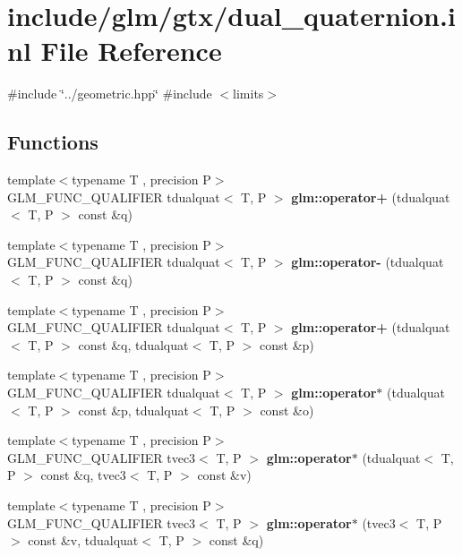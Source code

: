 \hypertarget{dual__quaternion_8inl}{}\section{include/glm/gtx/dual\+\_\+quaternion.inl File Reference}
\label{dual__quaternion_8inl}
{\ttfamily \#include \char`\"{}../geometric.\+hpp\char`\"{}}\newline
{\ttfamily \#include $<$limits$>$}\newline
\subsection*{Functions}
\begin{DoxyCompactItemize}
\item 
{\footnotesize template$<$typename T , precision P$>$ }\\G\+L\+M\+\_\+\+F\+U\+N\+C\+\_\+\+Q\+U\+A\+L\+I\+F\+I\+ER tdualquat$<$ T, P $>$ {\bfseries glm\+::operator+} (tdualquat$<$ T, P $>$ const \&q)
\item 
{\footnotesize template$<$typename T , precision P$>$ }\\G\+L\+M\+\_\+\+F\+U\+N\+C\+\_\+\+Q\+U\+A\+L\+I\+F\+I\+ER tdualquat$<$ T, P $>$ {\bfseries glm\+::operator-\/} (tdualquat$<$ T, P $>$ const \&q)
\item 
{\footnotesize template$<$typename T , precision P$>$ }\\G\+L\+M\+\_\+\+F\+U\+N\+C\+\_\+\+Q\+U\+A\+L\+I\+F\+I\+ER tdualquat$<$ T, P $>$ {\bfseries glm\+::operator+} (tdualquat$<$ T, P $>$ const \&q, tdualquat$<$ T, P $>$ const \&p)
\item 
{\footnotesize template$<$typename T , precision P$>$ }\\G\+L\+M\+\_\+\+F\+U\+N\+C\+\_\+\+Q\+U\+A\+L\+I\+F\+I\+ER tdualquat$<$ T, P $>$ {\bfseries glm\+::operator$\ast$} (tdualquat$<$ T, P $>$ const \&p, tdualquat$<$ T, P $>$ const \&o)
\item 
{\footnotesize template$<$typename T , precision P$>$ }\\G\+L\+M\+\_\+\+F\+U\+N\+C\+\_\+\+Q\+U\+A\+L\+I\+F\+I\+ER tvec3$<$ T, P $>$ {\bfseries glm\+::operator$\ast$} (tdualquat$<$ T, P $>$ const \&q, tvec3$<$ T, P $>$ const \&v)
\item 
{\footnotesize template$<$typename T , precision P$>$ }\\G\+L\+M\+\_\+\+F\+U\+N\+C\+\_\+\+Q\+U\+A\+L\+I\+F\+I\+ER tvec3$<$ T, P $>$ {\bfseries glm\+::operator$\ast$} (tvec3$<$ T, P $>$ const \&v, tdualquat$<$ T, P $>$ const \&q)

\end{DoxyCompactItemize}
